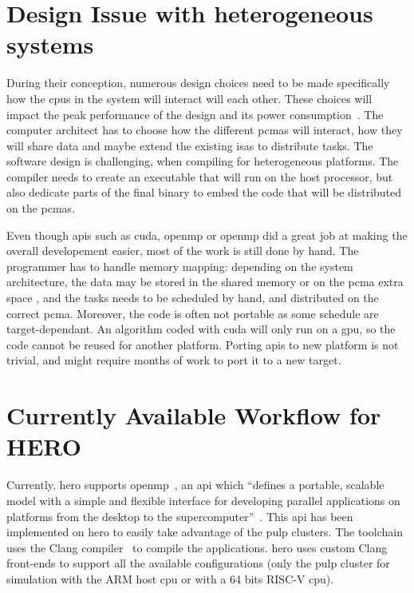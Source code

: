 \section {Design Issue with heterogeneous systems}

    During their conception, numerous design choices need to be made specifically how the \glspl{cpu} in the system will interact will each other. 
		These choices will impact the peak performance of the design and its power consumption~\cite{Art:Harnessing}.
		The computer architect has to choose how the different \glspl{pcma} will interact, how they will share data and maybe extend the existing \glspl{isa} to distribute tasks.
    The software design is challenging, when compiling for heterogeneous platforms.
	The compiler needs to create an executable that will run on the host processor, but also dedicate parts of the final binary to embed the code that will be distributed on the \glspl{pcma}.

	Even though \glspl{api} such as \gls{cuda}, \gls{openmp} or \gls{openmp} did a great job at making the overall developement easier, most of the work is still done by hand.
	The programmer has to handle memory mapping: depending on the system architecture, the data may be stored in the shared memory or on the \gls{pcma} extra space , and the tasks needs to be scheduled by hand, and distributed on the correct \gls{pcma}. 
	Moreover, the code is often not portable as some schedule are target-dependant.
	An algorithm coded with \gls{cuda} will only run on a \gls{gpu}, so the code cannot be reused for another platform.
	Porting \glspl{api} to new platform is not trivial, and might require months of work to port it to a new target.





\section {Currently Available Workflow for HERO}
    Currently, \gls{hero} supports \gls{openmp}~\cite{Report:SoftwareStack}, an \gls{api} which ``defines a portable, scalable model with a simple and flexible interface for developing parallel applications on platforms from the desktop to the supercomputer''~\cite{Web:OpenMp}. 
	This \gls{api} has been implemented on \gls{hero} to easily take advantage of the \gls{pulp} clusters. The toolchain uses the Clang compiler~\cite{Web:OpenMPCompilers} to compile the applications. \gls{hero} uses custom Clang front-ends to support all the available configurations (only the \gls{pulp} cluster for simulation with the ARM host \gls{cpu} or with a 64 bits RISC-V \gls{cpu}).

